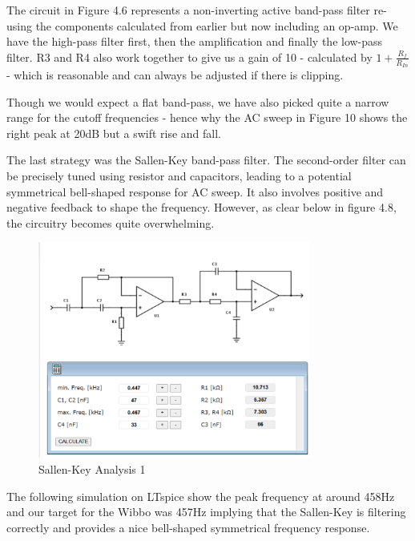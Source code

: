 The circuit in Figure 4.6 represents a non-inverting active band-pass filter re-using the components calculated from earlier but now including an op-amp. We have the high-pass filter first, then the amplification and finally the low-pass filter. R3 and R4 also work together to give us a gain of 10 - calculated by \(1+ \frac{R_f}{R_{In}} \) - which is reasonable and can always be adjusted if there is clipping.

Though we would expect a flat band-pass, we have also picked quite a narrow range for the cutoff frequencies - hence why the AC sweep in Figure 10 shows the right peak at 20dB but a swift rise and fall.

The last strategy was the Sallen-Key band-pass filter. The second-order filter can be precisely tuned using resistor and capacitors, leading to a potential symmetrical bell-shaped response for AC sweep. It also involves positive and negative feedback to shape the frequency. However, as clear below in figure 4.8, the circuitry becomes quite overwhelming.

\begin{figure}[h]
    \centering
    \includegraphics[width=0.8\textwidth]{subpages/images/sallen_key.png}
    \caption{Sallen-Key Analysis 1}
    \label{fig:sallen_key}
\end{figure}

The following simulation on LTspice show the peak frequency at around 458Hz and our target for the Wibbo was 457Hz implying that the Sallen-Key is filtering correctly and provides a nice bell-shaped symmetrical frequency response.

